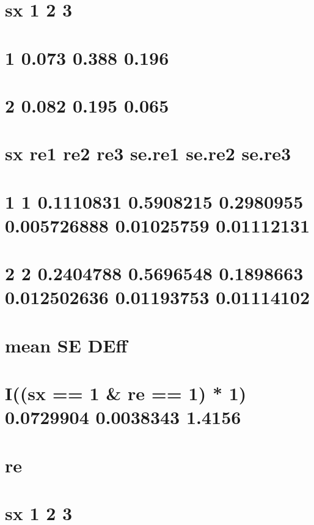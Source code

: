 \documentclass[]{book}
\theoremstyle{definition}
\theoremstyle{definition}
\theoremstyle{definition}
\theoremstyle{remark}
\begin{document}
\section{sx 1 2 3}\label{sx-1-2-3}

\section{1 0.073 0.388 0.196}\label{section-77}

\section{2 0.082 0.195 0.065}\label{section-78}

\section{sx re1 re2 re3 se.re1 se.re2
se.re3}\label{sx-re1-re2-re3-se.re1-se.re2-se.re3}

\section{1 1 0.1110831 0.5908215 0.2980955 0.005726888 0.01025759
0.01112131}\label{section-79}

\section{2 2 0.2404788 0.5696548 0.1898663 0.012502636 0.01193753
0.01114102}\label{section-80}

\section{mean SE DEff}\label{mean-se-deff-1}

\section{I((sx == 1 \& re == 1) * 1) 0.0729904 0.0038343
1.4156}\label{isx-1-re-1-1-0.0729904-0.0038343-1.4156}

\section{re}\label{re-1}

\section{sx 1 2 3}\label{sx-1-2-3-1}
\end{document}
